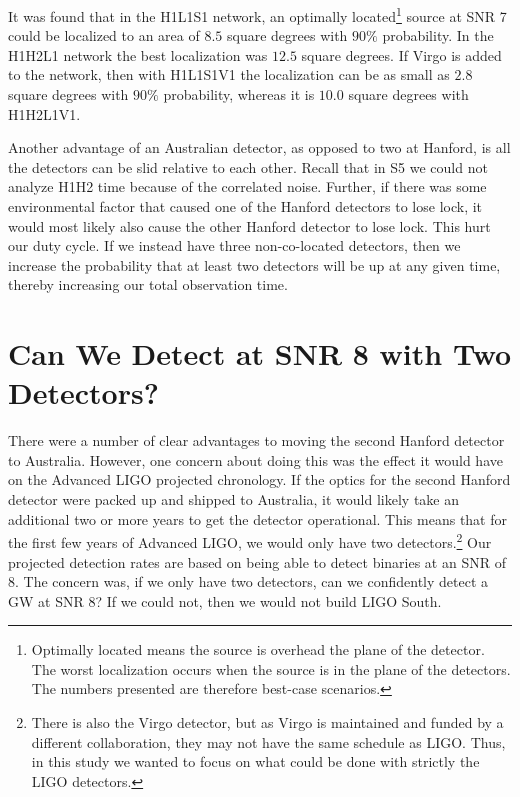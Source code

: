 It was found \cite{wiki:ligoSth:localization} that in the H1L1S1 network, an optimally located\footnote{Optimally located means the source is overhead the plane of the detector. The worst localization occurs when the source is in the plane of the detectors. The numbers presented are therefore best-case scenarios.} source at \ac{SNR} 7 could be localized to an area of $8.5$ square degrees with $90\%$ probability. In the H1H2L1 network the best localization was $12.5$ square degrees. If Virgo is added to the network, then with H1L1S1V1 the localization can be as small as $2.8$ square degrees with $90\%$ probability, whereas it is $10.0$ square degrees with H1H2L1V1.

Another advantage of an Australian detector, as opposed to two at Hanford, is all the detectors can be slid relative to each other. Recall that in \ac{S5} we could not analyze H1H2 time because of the correlated noise. Further, if there was some environmental factor that caused one of the Hanford detectors to lose lock, it would most likely also cause the other Hanford detector to lose lock. This hurt our duty cycle. If we instead have three non-co-located detectors, then we increase the probability that at least two detectors will be up at any given time, thereby increasing our total observation time.

\section{Can We Detect at SNR 8 with Two Detectors?}

There were a number of clear advantages to moving the second Hanford detector to Australia. However, one concern about doing this was the effect it would have on the Advanced LIGO projected chronology. If the optics for the second Hanford detector were packed up and shipped to Australia, it would likely take an additional two or more years to get the detector operational. This means that for the first few years of Advanced \ac{LIGO}, we would only have two detectors.\footnote{There is also the Virgo detector, but as Virgo is maintained and funded by a different collaboration, they may not have the same schedule as \ac{LIGO}. Thus, in this study we wanted to focus on what could be done with strictly the \ac{LIGO} detectors.} Our projected detection rates are based on being able to detect binaries at an \ac{SNR} of $8$. The concern was, if we only have two detectors, can we confidently detect a \ac{GW} at \ac{SNR} $8$? If we could not, then we would not build \ac{LIGO} South.

